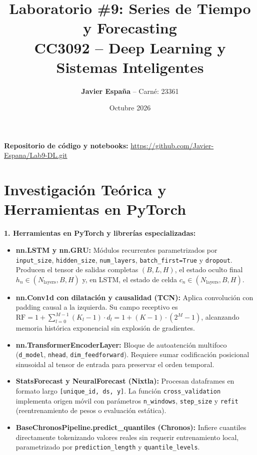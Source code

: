\documentclass[10pt,letterpaper]{article}
\title{\vspace{-1.5em}\textbf{Laboratorio \#9: Series de Tiempo y Forecasting}\\[0.2em]
\large CC3092 -- Deep Learning y Sistemas Inteligentes}
\author{\textbf{Javier España} -- Carné: 23361}
\date{Octubre 2026\vspace{-1.0em}}
\begin{document}
\maketitle

\begin{center}
\vspace{-0.8em}
\small \textbf{Repositorio de código y notebooks:} \url{https://github.com/Javier-Espana/Lab9-DL.git}
\vspace{-0.2em}
\end{center}

\section{Investigación Teórica y Herramientas en PyTorch}

\textbf{1. Herramientas en PyTorch y librerías especializadas:}
\begin{itemize}\setlength\itemsep{0.1em}
    \item \textbf{nn.LSTM y nn.GRU:} Módulos recurrentes parametrizados por \texttt{input\_size}, \texttt{hidden\_size}, \texttt{num\_layers}, \texttt{batch\_first=True} y \texttt{dropout}. Producen el tensor de salidas completas $(B, L, H)$, el estado oculto final $h_n \in (N_{\text{layers}}, B, H)$ y, en LSTM, el estado de celda $c_n \in (N_{\text{layers}}, B, H)$.
    \item \textbf{nn.Conv1d con dilatación y causalidad (TCN):} Aplica convolución con padding causal a la izquierda. Su campo receptivo es $\text{RF} = 1 + \sum_{l=0}^{M-1} (K_l - 1) \cdot d_l = 1 + (K - 1) \cdot (2^M - 1)$, alcanzando memoria histórica exponencial sin explosión de gradientes.
    \item \textbf{nn.TransformerEncoderLayer:} Bloque de autoatención multifoco (\texttt{d\_model}, \texttt{nhead}, \texttt{dim\_feedforward}). Requiere sumar codificación posicional sinusoidal al tensor de entrada para preservar el orden temporal.
    \item \textbf{StatsForecast y NeuralForecast (Nixtla):} Procesan dataframes en formato largo \texttt{[unique\_id, ds, y]}. La función \texttt{cross\_validation} implementa origen móvil con parámetros \texttt{n\_windows}, \texttt{step\_size} y \texttt{refit} (reentrenamiento de pesos o evaluación estática).
    \item \textbf{BaseChronosPipeline.predict\_quantiles (Chronos):} Infiere cuantiles directamente tokenizando valores reales sin requerir entrenamiento local, parametrizado por \texttt{prediction\_length} y \texttt{quantile\_levels}.
\end{itemize}
\end{document}

